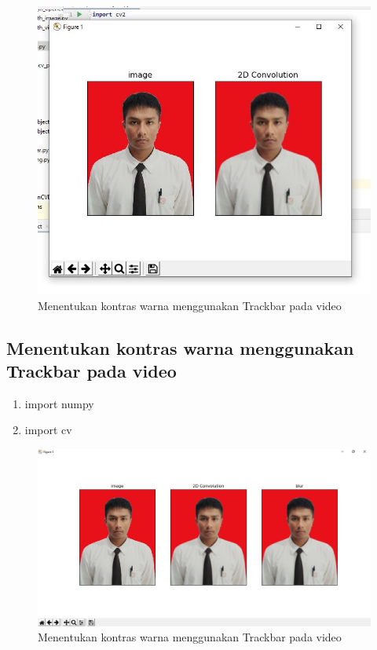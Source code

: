 \newpage
\begin{figure}[ht]
\centering
\includegraphics[scale=0.5]{figures/2,59.jpg}
\caption{Menentukan kontras warna menggunakan Trackbar pada video}
\label{contoh}
\end{figure}







\newpage
\subsection{Menentukan kontras warna menggunakan Trackbar pada video}

\begin{enumerate}
	\item import numpy
	\item import cv
\end{enumerate}

\newpage
\begin{figure}[ht]
\centering
\includegraphics[scale=0.5]{figures/2,60.jpg}
\caption{Menentukan kontras warna menggunakan Trackbar pada video}
\label{contoh}
\end{figure}







